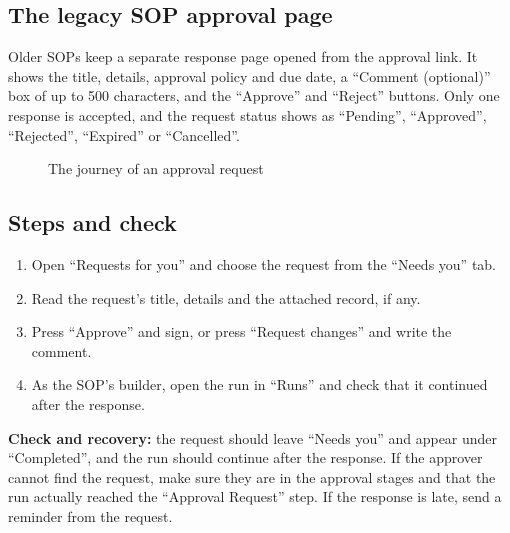 \subsection{The legacy SOP approval page}

Older SOPs keep a separate response page opened from the approval link. It shows the title, details, approval policy and due date, a “Comment (optional)” box of up to 500 characters, and the “Approve” and “Reject” buttons. Only one response is accepted, and the request status shows as “Pending”, “Approved”, “Rejected”, “Expired” or “Cancelled”.

\begin{figure}[H]
\centering
{}
\rclegend
\caption{The journey of an approval request}
\label{fig:builder-isop-approvals-flow}
\end{figure}

\subsection{Steps and check}
\begin{enumerate}
\item Open “Requests for you” and choose the request from the “Needs you” tab.
\item Read the request's title, details and the attached record, if any.
\item Press “Approve” and sign, or press “Request changes” and write the comment.
\item As the SOP's builder, open the run in “Runs” and check that it continued after the response.
\end{enumerate}

\textbf{Check and recovery:} the request should leave “Needs you” and appear under “Completed”, and the run should continue after the response. If the approver cannot find the request, make sure they are in the approval stages and that the run actually reached the “Approval Request” step. If the response is late, send a reminder from the request.

